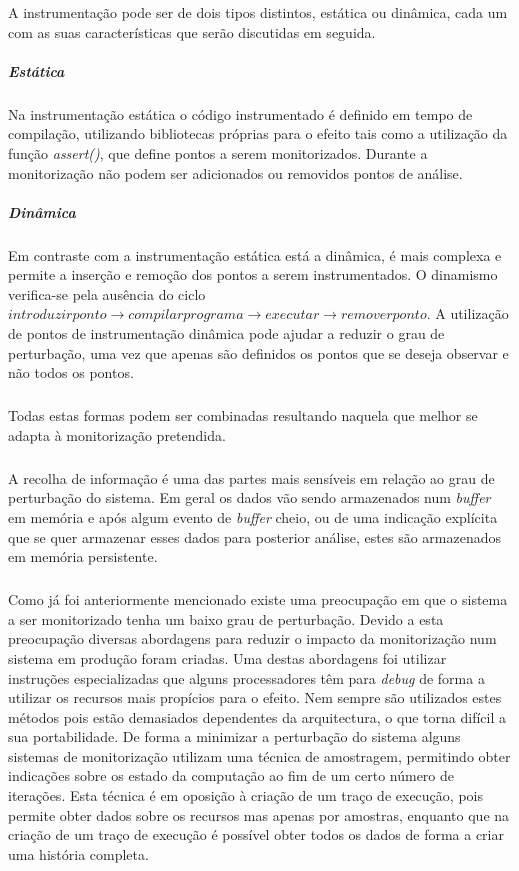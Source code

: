 \begin{itemize}
A instrumentação pode ser de dois tipos distintos, estática ou dinâmica, cada um com as suas características que serão discutidas em seguida.

\subparagraph*{Estática}

Na instrumentação estática o código instrumentado é definido em tempo de compilação, utilizando bibliotecas próprias para o efeito tais como a utilização da função \textit{assert()}, que define pontos a serem monitorizados.
Durante a monitorização não podem ser adicionados ou removidos pontos de análise.

\subparagraph*{Dinâmica}

Em contraste com a instrumentação estática está a dinâmica, é mais complexa e permite a inserção e remoção dos pontos a serem instrumentados.
O dinamismo verifica-se pela ausência do ciclo $introduzir ponto\rightarrow compilar programa\rightarrow executar\rightarrow remover ponto$.
A utilização de pontos de instrumentação dinâmica pode ajudar a reduzir o grau de perturbação, uma vez que apenas são definidos os pontos que se deseja observar e não todos os pontos.
\end{itemize}
\subparagraph*{}
Todas estas formas podem ser combinadas resultando naquela que melhor se adapta à monitorização pretendida.

\subparagraph*{
}
A recolha de informação é uma das partes mais sensíveis em relação ao grau de perturbação do sistema.
Em geral os dados vão sendo armazenados num \textit{buffer} em memória e após algum evento de \textit{buffer} cheio, ou de uma indicação explícita que se quer armazenar esses dados para posterior análise, estes são armazenados em memória persistente. 

\subparagraph*{
}
Como já foi anteriormente mencionado existe uma preocupação em que o sistema a ser monitorizado tenha um baixo grau de perturbação.
Devido a esta preocupação diversas abordagens para reduzir o impacto da monitorização num sistema em produção foram criadas.
Uma destas abordagens foi utilizar instruções especializadas que alguns processadores têm para \textit{debug} de forma a utilizar os recursos mais propícios para o efeito.
Nem sempre são utilizados estes métodos pois estão demasiados dependentes da arquitectura, o que torna difícil a sua portabilidade.
De forma a minimizar a perturbação do sistema alguns sistemas de monitorização utilizam uma técnica de amostragem, permitindo obter indicações sobre os estado da computação ao fim de um certo número de iterações.
Esta técnica é em oposição à criação de um traço de execução, pois permite obter dados sobre os recursos mas apenas por amostras, enquanto que na criação de um traço de execução é possível obter todos os dados de forma a criar uma história completa.

